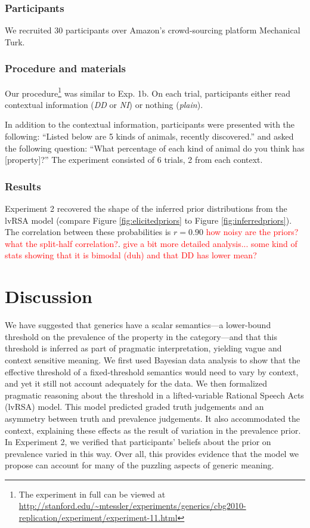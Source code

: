 \documentclass[10pt,letterpaper]{article}
\newcommand{\red}[1]{\textcolor{Red}{#1}}
\begin{document}
\subsubsection{Participants}

We recruited 30 participants over Amazon's crowd-sourcing platform Mechanical Turk. 

\subsubsection{Procedure and materials}

Our procedure\footnote{The experiment in full can be viewed at \url{http://stanford.edu/~mtessler/experiments/generics/cbg2010-replication/experiment/experiment-11.html}} was similar to Exp. 1b. On each trial, participants either read contextual information (\emph{DD} or \emph{NI}) or nothing (\emph{plain}). 

In addition to the contextual information, participants were presented with the following: ``Listed below are 5 kinds of animals, recently discovered.'' and asked the following question: ``What percentage of each kind of animal do you think has [property]?'' The experiment consisted of 6 trials, 2 from each context. 

\subsubsection{Results}

Experiment 2 recovered the shape of the inferred prior distributions from the lvRSA model (compare Figure \ref{fig:elicitedpriors} to Figure \ref{fig:inferredpriors}). The correlation between these probabilities is $r = 0.90$ \red{how noisy are the priors? what the split-half correlation?}.
\red{give a bit more detailed analysis... some kind of stats showing that it is bimodal (duh) and that DD has lower mean?}

\section{Discussion}

We have suggested that generics have a scalar semantics---a lower-bound threshold on the prevalence of the property in the category---and that this threshold is inferred as part of pragmatic interpretation, yielding vague and context sensitive meaning. We first used Bayesian data analysis to show that the effective threshold of a fixed-threshold semantics would need to vary by context, and yet it still not account adequately for the data. We then formalized pragmatic reasoning about the threshold in a lifted-variable Rational Speech Acts (lvRSA) model. This model predicted graded truth judgements and an asymmetry between truth and prevalence judgements. It also accommodated the context, explaining these effects as the result of variation in the prevalence prior. In Experiment 2, we verified that participants' beliefs about the prior on prevalence varied in this way. Over all, this provides evidence that the model we propose can account for many of the puzzling aspects of generic meaning.
\end{document}
